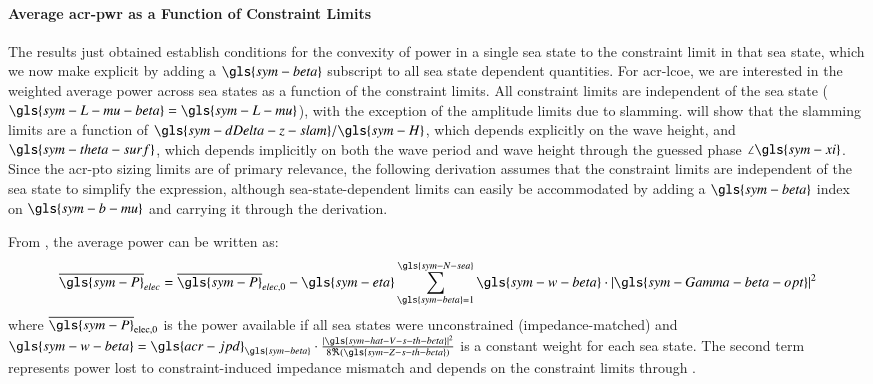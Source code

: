 \paragraph{Average \gls{acr-pwr} as a Function of Constraint Limits}
The results just obtained establish conditions for the convexity of power in a single sea state to the constraint limit in that sea state, which we now make explicit by adding a $\gls{sym-beta}$ subscript to all sea state dependent quantities.
For \gls{acr-lcoe}, we are interested in the weighted average power across sea states as a function of the constraint limits.
All constraint limits are independent of the sea state ($\gls{sym-L-mu-beta}=\gls{sym-L-mu}$), with the exception of the amplitude limits due to slamming.
 will show that the slamming limits are a function of $\gls{sym-dDelta-z-slam}/\gls{sym-H}$, which depends explicitly on the wave height, and $\gls{sym-theta-surf}$, which depends implicitly on both the wave period and wave height through the guessed phase $\angle\gls{sym-xi}$.
Since the \gls{acr-pto} sizing limits are of primary relevance, the following derivation assumes that the constraint limits are independent of the sea state to simplify the expression, although sea-state-dependent limits can easily be accommodated by adding a $\gls{sym-beta}$ index on $\gls{sym-b-mu}$ and carrying it through the derivation.

From , the average power can be written as:
\begin{equation}\label{eq:power-elec-sensitivity}
    \overline{\gls{sym-P}}_{elec} = \overline{\gls{sym-P}}_{elec,0}
    - \gls{sym-eta} \sum_{\gls{sym-beta}=1}^{\gls{sym-N-sea}} \gls{sym-w-beta}
    \cdot |\gls{sym-Gamma-beta-opt}|^2
\end{equation}
where $\overline{\gls{sym-P}}_{\text{elec},0}$ is the power available if all sea states were unconstrained (impedance-matched) and
$\gls{sym-w-beta}=\gls{acr-jpd}_{\gls{sym-beta}} \cdot
    \frac{|\gls{sym-hat-V-s-th-beta}|^2}
         {8\Re (\gls{sym-Z-s-th-beta})}$ is a constant weight for each sea state.
The second term represents power lost to constraint-induced impedance mismatch and depends on the constraint limits through .

